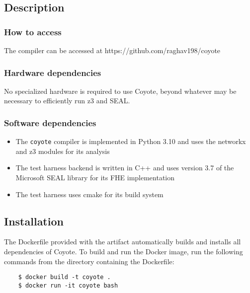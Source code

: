 \subsection{Description}

\subsubsection{How to access}

The \system compiler can be accessed at https://github.com/raghav198/coyote

\subsubsection{Hardware dependencies}
No specialized hardware is required to use Coyote, beyond whatever may be necessary to efficiently run z3 and SEAL.

\subsubsection{Software dependencies}
\begin{itemize}
    \item The {\tt coyote} compiler is implemented in Python 3.10 and uses the networkx and z3 modules for its analysis
    \item The test harness backend is written in C++ and uses version 3.7 of the Microsoft SEAL library for its FHE implementation
    \item The test harness uses cmake for its build system
\end{itemize}

\subsection{Installation}

The Dockerfile provided with the artifact automatically builds and installs all dependencies of Coyote. To build and run the Docker image, run the following commands from the directory containing the Dockerfile:

\begin{verbatim}
    $ docker build -t coyote .
    $ docker run -it coyote bash
\end{verbatim}

